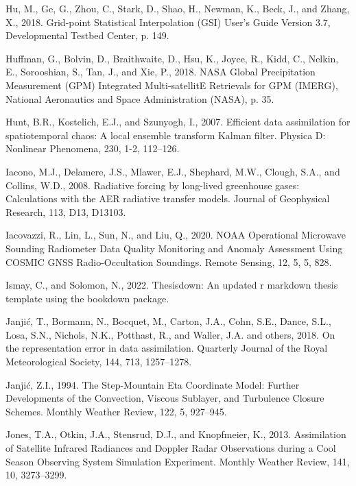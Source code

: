 \documentclass[12pt,oneside,a4paper]{reedthesis}
\begin{document}
\leavevmode\hypertarget{ref-hu2018}{}%
Hu, M., Ge, G., Zhou, C., Stark, D., Shao, H., Newman, K., Beck, J., and Zhang, X., 2018. Grid-point Statistical Interpolation (GSI) User's Guide Version 3.7, Developmental Testbed Center, p. 149.

\leavevmode\hypertarget{ref-huffman2018}{}%
Huffman, G., Bolvin, D., Braithwaite, D., Hsu, K., Joyce, R., Kidd, C., Nelkin, E., Sorooshian, S., Tan, J., and Xie, P., 2018. NASA Global Precipitation Measurement (GPM) Integrated Multi-satellitE Retrievals for GPM (IMERG), National Aeronautics and Space Administration (NASA), p. 35.

\leavevmode\hypertarget{ref-hunt2007}{}%
Hunt, B.R., Kostelich, E.J., and Szunyogh, I., 2007. Efficient data assimilation for spatiotemporal chaos: A local ensemble transform Kalman filter. Physica D: Nonlinear Phenomena, 230, 1-2, 112--126.

\leavevmode\hypertarget{ref-iacono2008}{}%
Iacono, M.J., Delamere, J.S., Mlawer, E.J., Shephard, M.W., Clough, S.A., and Collins, W.D., 2008. Radiative forcing by long-lived greenhouse gases: Calculations with the AER radiative transfer models. Journal of Geophysical Research, 113, D13, D13103.

\leavevmode\hypertarget{ref-iacovazzi2020}{}%
Iacovazzi, R., Lin, L., Sun, N., and Liu, Q., 2020. NOAA Operational Microwave Sounding Radiometer Data Quality Monitoring and Anomaly Assessment Using COSMIC GNSS Radio-Occultation Soundings. Remote Sensing, 12, 5, 5, 828.

\leavevmode\hypertarget{ref-ismay2022}{}%
Ismay, C., and Solomon, N., 2022. Thesisdown: An updated r markdown thesis template using the bookdown package.

\leavevmode\hypertarget{ref-janjic2018}{}%
Janjić, T., Bormann, N., Bocquet, M., Carton, J.A., Cohn, S.E., Dance, S.L., Losa, S.N., Nichols, N.K., Potthast, R., and Waller, J.A. and others, 2018. On the representation error in data assimilation. Quarterly Journal of the Royal Meteorological Society, 144, 713, 1257--1278.

\leavevmode\hypertarget{ref-janjic1994}{}%
Janjić, Z.I., 1994. The Step-Mountain Eta Coordinate Model: Further Developments of the Convection, Viscous Sublayer, and Turbulence Closure Schemes. Monthly Weather Review, 122, 5, 927--945.

\leavevmode\hypertarget{ref-jones2013}{}%
Jones, T.A., Otkin, J.A., Stensrud, D.J., and Knopfmeier, K., 2013. Assimilation of Satellite Infrared Radiances and Doppler Radar Observations during a Cool Season Observing System Simulation Experiment. Monthly Weather Review, 141, 10, 3273--3299.
\end{document}

